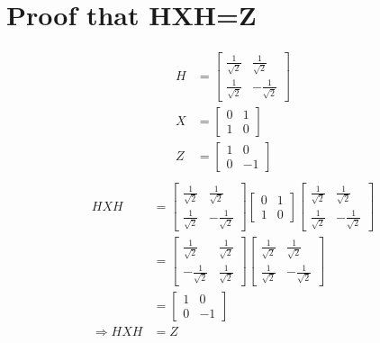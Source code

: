 \documentclass{article}
\begin{document}
\section{Proof that HXH=Z}
\begin{equation}
\begin{split}
    H & = \begin{bmatrix}
        \frac{1}{\sqrt{2}} & \frac{1}{\sqrt{2}} \\
        \frac{1}{\sqrt{2}} & -\frac{1}{\sqrt{2}}
    \end{bmatrix} \\
    X & = \begin{bmatrix}
        0 & 1 \\
        1 & 0
    \end{bmatrix} \\
    Z & = \begin{bmatrix}
        1 & 0 \\
        0 & -1
    \end{bmatrix} \\
\end{split}
\end{equation}
\begin{equation}
\begin{split}
    HXH & = \begin{bmatrix}
            \frac{1}{\sqrt{2}} & \frac{1}{\sqrt{2}} \\
            \frac{1}{\sqrt{2}} & -\frac{1}{\sqrt{2}}
        \end{bmatrix} \begin{bmatrix}
            0 & 1 \\
            1 & 0
        \end{bmatrix} \begin{bmatrix}
            \frac{1}{\sqrt{2}} & \frac{1}{\sqrt{2}} \\
            \frac{1}{\sqrt{2}} & -\frac{1}{\sqrt{2}}
        \end{bmatrix} \\
    & = \begin{bmatrix}
            \frac{1}{\sqrt{2}} & \frac{1}{\sqrt{2}} \\
            -\frac{1}{\sqrt{2}} & \frac{1}{\sqrt{2}}
        \end{bmatrix} \begin{bmatrix}
            \frac{1}{\sqrt{2}} & \frac{1}{\sqrt{2}} \\
            \frac{1}{\sqrt{2}} & -\frac{1}{\sqrt{2}}
        \end{bmatrix} \\
    & = \begin{bmatrix}
            1 & 0 \\
            0 & -1
        \end{bmatrix} \\
    \Longrightarrow HXH & = Z
\end{split}
\end{equation}
\end{document}
